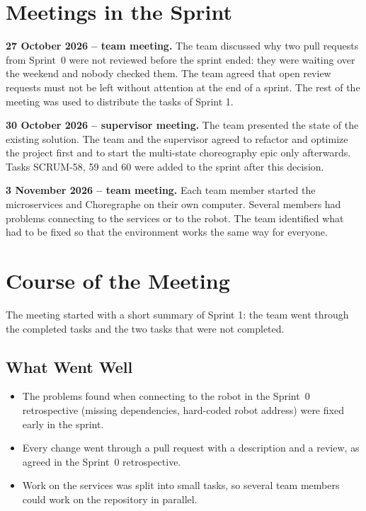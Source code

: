 \documentclass[12pt,a4paper]{article}
\newcommand{\sprintname}{Sprint 1}
\begin{document}

\section{Meetings in the Sprint}


\textbf{27 October 2026 -- team meeting.}
The team discussed why two pull requests from Sprint~0 were not reviewed
before the sprint ended: they were waiting over the weekend and nobody
checked them. The team agreed that open review requests must not be left
without attention at the end of a sprint. The rest of the meeting was used
to distribute the tasks of \sprintname{}.

\textbf{30 October 2026 -- supervisor meeting.}
The team presented the state of the existing solution. The team and the
supervisor agreed to refactor and optimize the project first and to start
the multi-state choreography epic only afterwards. Tasks SCRUM-58, 59 and 60
were added to the sprint after this decision.

\textbf{3 November 2026 -- team meeting.}
Each team member started the microservices and Choregraphe on their own
computer. Several members had problems connecting to the services or to the
robot. The team identified what had to be fixed so that the environment
works the same way for everyone.



\section{Course of the Meeting}

The meeting started with a short summary of \sprintname{}: the team went
through the completed tasks and the two tasks that were not completed.

\subsection{What Went Well}

\begin{itemize}
    \item The problems found when connecting to the robot in the Sprint~0
          retrospective (missing dependencies, hard-coded robot address)
          were fixed early in the sprint.
    \item Every change went through a pull request with a description and
          a review, as agreed in the Sprint~0 retrospective.
    \item Work on the services was split into small tasks, so several team
          members could work on the repository in parallel.
\end{itemize}
\end{document}
